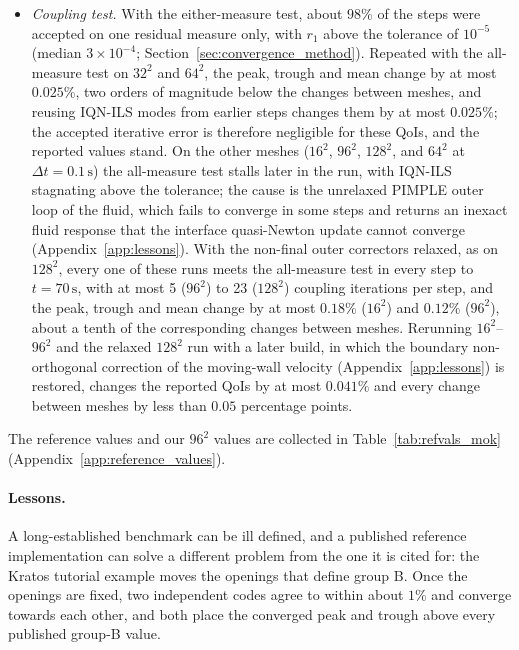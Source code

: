 \begin{itemize}
	\item \emph{Coupling test.} With the either-measure test, about $98\%$ of the steps were accepted on one residual measure only, with $r_1$ above the tolerance of $10^{-5}$ (median $3\times10^{-4}$; Section~\ref{sec:convergence_method}). Repeated with the all-measure test on $32^2$ and $64^2$, the peak, trough and mean change by at most $0.025\%$, two orders of magnitude below the changes between meshes, and reusing IQN-ILS modes from earlier steps changes them by at most $0.025\%$; the accepted iterative error is therefore negligible for these QoIs, and the reported values stand. On the other meshes ($16^2$, $96^2$, $128^2$, and $64^2$ at $\Delta t = 0.1\,\mathrm{s}$) the all-measure test stalls later in the run, with IQN-ILS stagnating above the tolerance; the cause is the unrelaxed PIMPLE outer loop of the fluid, which fails to converge in some steps and returns an inexact fluid response that the interface quasi-Newton update cannot converge (Appendix~\ref{app:lessons}). With the non-final outer correctors relaxed, as on $128^2$, every one of these runs meets the all-measure test in every step to $t = 70\,\mathrm{s}$, with at most 5 ($96^2$) to 23 ($128^2$) coupling iterations per step, and the peak, trough and mean change by at most $0.18\%$ ($16^2$) and $0.12\%$ ($96^2$), about a tenth of the corresponding changes between meshes. Rerunning $16^2$--$96^2$ and the relaxed $128^2$ run with a later build, in which the boundary non-orthogonal correction of the moving-wall velocity (Appendix~\ref{app:lessons}) is restored, changes the reported QoIs by at most $0.041\%$ and every change between meshes by less than $0.05$ percentage points.
\end{itemize}

The reference values and our $96^2$ values are collected in Table~\ref{tab:refvals_mok} (Appendix~\ref{app:reference_values}).

\paragraph{Lessons.}
A long-established benchmark can be ill defined, and a published reference implementation can solve a different problem from the one it is cited for: the Kratos tutorial example moves the openings that define group B.
Once the openings are fixed, two independent codes agree to within about $1\%$ and converge towards each other, and both place the converged peak and trough above every published group-B value.


